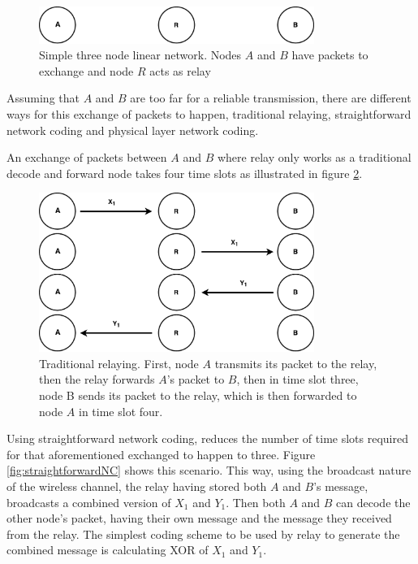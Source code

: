 \begin{figure}
    \centering
    \includegraphics[width=0.8\textwidth]{figures/justThreeNodes.pdf}
    \caption{Simple three node linear network. Nodes $A$ and $B$ have packets to exchange and node $R$ acts as relay} \label{fig:justThreeNodes}
\end{figure}

Assuming that $A$ and $B$ are too far for a reliable transmission, there are different ways for this exchange of packets to happen, traditional relaying, straightforward network coding and physical layer network coding.

An exchange of packets between $A$ and $B$ where relay only works as a traditional decode and forward node takes four time slots as illustrated in figure \ref{fig:traditionalRelay}.  

\begin{figure}
    \centering
    \includegraphics[width=0.8\textwidth]{figures/traditionalRelay.pdf}
    \caption{Traditional relaying. First, node $A$ transmits its packet to the relay, then the relay forwards $A$'s packet to $B$, then in time slot three, node B sends its packet to the relay, which is then forwarded to node $A$ in time slot four.} \label{fig:traditionalRelay}
\end{figure}

Using straightforward network coding, reduces the number of time slots required for that aforementioned exchanged to happen to three. Figure \ref{fig:straightforwardNC} shows this scenario. This way, using the broadcast nature of the wireless channel, the relay having stored both $A$ and $B$'s message, broadcasts a combined version of $X_1$ and $Y_1$. Then both $A$ and $B$ can decode the other node's packet, having their own message and the message they received from the relay. The simplest coding scheme to be used by relay to generate the combined message is calculating XOR of  $X_1$ and $Y_1$.

